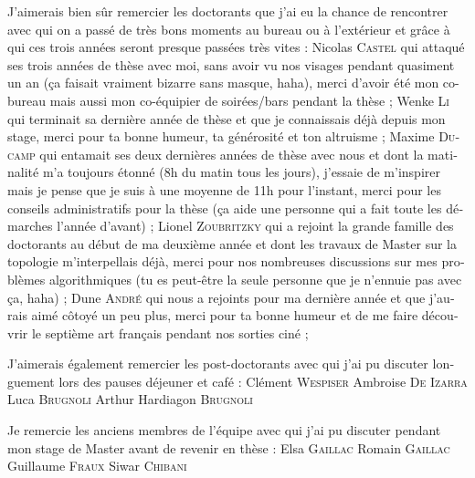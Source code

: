 \begin{otherlanguage}{french}
J'aimerais bien sûr remercier les doctorants que j'ai eu la chance de rencontrer avec qui on a passé de très bons moments au bureau ou à l'extérieur et grâce à qui ces trois années seront presque passées très vites :
Nicolas \textsc{Castel} qui attaqué ses trois années de thèse avec moi, sans avoir vu nos visages pendant quasiment un an (ça faisait vraiment bizarre sans masque, haha), merci d'avoir été mon co-bureau mais aussi mon co-équipier de soirées/bars pendant la thèse ; 
Wenke \textsc{Li} qui terminait sa dernière année de thèse et que je connaissais déjà depuis mon stage, merci pour ta bonne humeur, ta générosité et ton altruisme ;
Maxime \textsc{Ducamp} qui entamait ses deux dernières années de thèse avec nous et dont la matinalité m'a toujours étonné (8h du matin tous les jours), j'essaie de m'inspirer mais je pense que je suis à une moyenne de 11h pour l'instant, merci pour les conseils administratifs pour la thèse (ça aide une personne qui a fait toute les démarches l'année d'avant) ;
Lionel \textsc{Zoubritzky} qui a rejoint la grande famille des doctorants au début de ma deuxième année et dont les travaux de Master sur la topologie m'interpellais déjà, merci pour nos nombreuses discussions sur mes problèmes algorithmiques (tu es peut-être la seule personne que je n'ennuie pas avec ça, haha) ;
Dune \textsc{André} qui nous a rejoints pour ma dernière année et que j'aurais aimé côtoyé un peu plus, merci pour ta bonne humeur et de me faire découvrir le septième art français pendant nos sorties ciné ;

J'aimerais également remercier les post-doctorants avec qui j'ai pu discuter longuement lors des pauses déjeuner et café :
Clément \textsc{Wespiser}
Ambroise \textsc{De Izarra} 
Luca \textsc{Brugnoli} 
Arthur Hardiagon \textsc{Brugnoli} 

Je remercie les anciens membres de l'équipe avec qui j'ai pu discuter pendant mon stage de Master avant de revenir en thèse :
Elsa \textsc{Gaillac}
Romain \textsc{Gaillac}
Guillaume \textsc{Fraux}
Siwar \textsc{Chibani}




\endgroup

\clearpage
\mbox{}
\thispagestyle{empty}
\clearpage

%
%
%
%
%
%
%

\end{otherlanguage}

